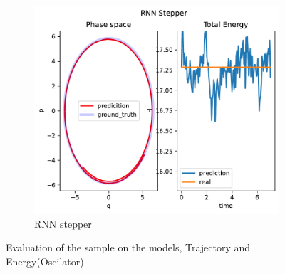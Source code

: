 \begin{figure}[H]
\begin{subfigure}[b]{0.3\textwidth}
		\centering
		\includegraphics[width=\textwidth]{chapters/chapter5/osci_rne_ps.pdf}
		\caption{RNN stepper}
	\end{subfigure}
	
	\caption{Evaluation of the sample on the models, Trajectory and Energy(Oscilator)}
	\label{osci_traj}
\end{figure}
	

 


